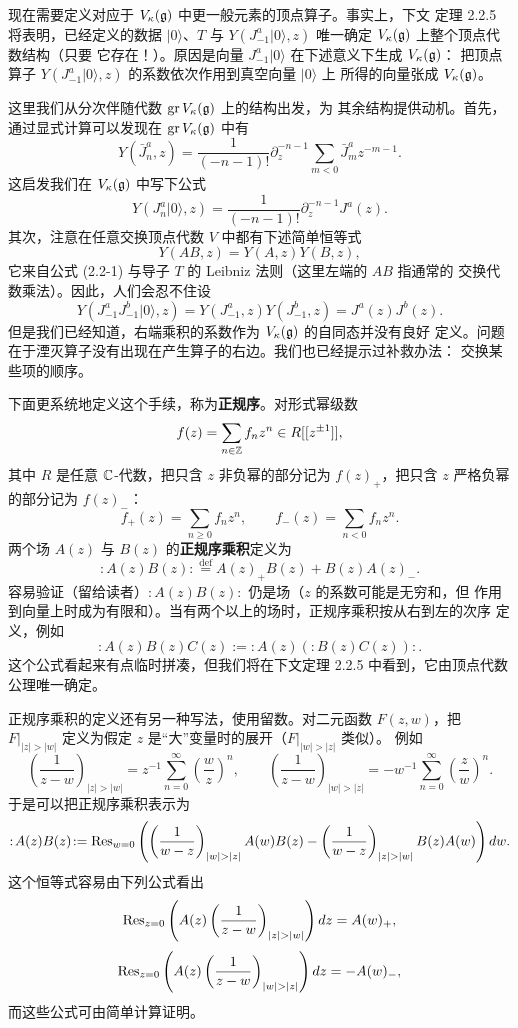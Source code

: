 现在需要定义对应于 $V_\kappa(\mathfrak{g})$ 中更一般元素的顶点算子。事实上，下文
定理 2.2.5 将表明，已经定义的数据 $|0\rangle$、$T$ 与
$Y(J^a_{-1}|0\rangle,z)$ 唯一确定 $V_\kappa(\mathfrak{g})$ 上整个顶点代数结构（只要
它存在！）。原因是向量 $J^a_{-1}|0\rangle$ 在下述意义下生成 $V_\kappa(\mathfrak{g})$：
把顶点算子 $Y(J^a_{-1}|0\rangle,z)$ 的系数依次作用到真空向量 $|0\rangle$ 上
所得的向量张成 $V_\kappa(\mathfrak{g})$。

这里我们从分次伴随代数 $\operatorname{gr}V_\kappa(\mathfrak{g})$ 上的结构出发，为
其余结构提供动机。首先，通过显式计算可以发现在
$\operatorname{gr}V_\kappa(\mathfrak{g})$ 中有
\[
    Y(\bar J^a_n,z)
    =\frac{1}{(-n-1)!}\partial_z^{-n-1}\sum_{m<0}\bar J^a_mz^{-m-1}.
\]
这启发我们在 $V_\kappa(\mathfrak{g})$ 中写下公式
\[
    Y(J^a_n|0\rangle,z)
    =\frac{1}{(-n-1)!}\partial_z^{-n-1}J^a(z).
\]
其次，注意在任意交换顶点代数 $V$ 中都有下述简单恒等式
\[
    Y(AB,z)=Y(A,z)Y(B,z),
\]
它来自公式 (2.2-1) 与导子 $T$ 的 Leibniz 法则（这里左端的 $AB$ 指通常的
交换代数乘法）。因此，人们会忍不住设
\[
    Y(J^a_{-1}J^b_{-1}|0\rangle,z)
    =Y(J^a_{-1},z)Y(J^b_{-1},z)=J^a(z)J^b(z).
\]
但是我们已经知道，右端乘积的系数作为 $V_\kappa(\mathfrak{g})$ 的自同态并没有良好
定义。问题在于湮灭算子没有出现在产生算子的右边。我们也已经提示过补救办法：
交换某些项的顺序。

下面更系统地定义这个手续，称为\textbf{正规序}。对形式幂级数
\[
    f(z)=\sum_{n\in\mathbb{Z}}f_nz^n\in R[[z^{\pm1}]],
\]
其中 $R$ 是任意 $\mathbb{C}$-代数，把只含 $z$ 非负幂的部分记为 $f(z)_+$，把只含
$z$ 严格负幂的部分记为 $f(z)_-$：
\[
    f_+(z)=\sum_{n\ge0}f_nz^n,\qquad
    f_-(z)=\sum_{n<0}f_nz^n.
\]
两个场 $A(z)$ 与 $B(z)$ 的\textbf{正规序乘积}定义为
\[
    :\!A(z)B(z)\!:\overset{\mathrm{def}}{=}
    A(z)_+B(z)+B(z)A(z)_-.
\]
容易验证（留给读者）$:\!A(z)B(z)\!:$ 仍是场（$z$ 的系数可能是无穷和，但
作用到向量上时成为有限和）。当有两个以上的场时，正规序乘积按从右到左的次序
定义，例如
\[
    :\!A(z)B(z)C(z)\!:=:\!A(z)(:\!B(z)C(z)\!)\!:.
\]
这个公式看起来有点临时拼凑，但我们将在下文定理 2.2.5 中看到，它由顶点代数
公理唯一确定。

正规序乘积的定义还有另一种写法，使用留数。对二元函数 $F(z,w)$，把
$F|_{|z|>|w|}$ 定义为假定 $z$ 是“大”变量时的展开（$F|_{|w|>|z|}$ 类似）。
例如
\[
    \left(\frac{1}{z-w}\right)_{|z|>|w|}
    =z^{-1}\sum_{n=0}^{\infty}\left(\frac{w}{z}\right)^n,
    \qquad
    \left(\frac{1}{z-w}\right)_{|w|>|z|}
    =-w^{-1}\sum_{n=0}^{\infty}\left(\frac{z}{w}\right)^n.
\]
于是可以把正规序乘积表示为
\[
    :\!A(z)B(z)\!:
    =\Res_{w=0}\left(
    \left(\frac{1}{w-z}\right)_{|w|>|z|}A(w)B(z)
    -\left(\frac{1}{w-z}\right)_{|z|>|w|}B(z)A(w)
    \right)dw.
\]
这个恒等式容易由下列公式看出
\[
    \Res_{z=0}\left(A(z)
    \left(\frac{1}{z-w}\right)_{|z|>|w|}\right)dz=A(w)_+,
\]
\[
    \Res_{z=0}\left(A(z)
    \left(\frac{1}{z-w}\right)_{|w|>|z|}\right)dz=-A(w)_-,
\]
而这些公式可由简单计算证明。

